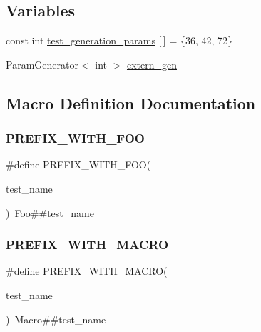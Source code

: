 \subsection*{Variables}
\begin{DoxyCompactItemize}
\item 
const int \mbox{\hyperlink{googletest-master_2googletest_2test_2googletest-param-test-test_8cc_aefe5c7eafc17e71cec010d92628bf84f}{test\+\_\+generation\+\_\+params}} \mbox{[}$\,$\mbox{]} = \{36, 42, 72\}
\item 
Param\+Generator$<$ int $>$ \mbox{\hyperlink{googletest-master_2googletest_2test_2googletest-param-test-test_8cc_a0f691f1461778d71f30b1fb1dea1cb50}{extern\+\_\+gen}}
\end{DoxyCompactItemize}


\subsection{Macro Definition Documentation}
\mbox{\label{googletest-master_2googletest_2test_2googletest-param-test-test_8cc_a6414de581a925e7399b27c14e38f8a67}} 
\subsubsection{\texorpdfstring{PREFIX\_WITH\_FOO}{PREFIX\_WITH\_FOO}}
{\footnotesize\ttfamily \#define P\+R\+E\+F\+I\+X\+\_\+\+W\+I\+T\+H\+\_\+\+F\+OO(\begin{DoxyParamCaption}\item[{}]{test\+\_\+name }\end{DoxyParamCaption})~Foo\#\#test\+\_\+name}

\mbox{\label{googletest-master_2googletest_2test_2googletest-param-test-test_8cc_aeb9b224f65fb5b0b8f2323a6903d6a68}} 
\subsubsection{\texorpdfstring{PREFIX\_WITH\_MACRO}{PREFIX\_WITH\_MACRO}}
{\footnotesize\ttfamily \#define P\+R\+E\+F\+I\+X\+\_\+\+W\+I\+T\+H\+\_\+\+M\+A\+C\+RO(\begin{DoxyParamCaption}\item[{}]{test\+\_\+name }\end{DoxyParamCaption})~Macro\#\#test\+\_\+name}




